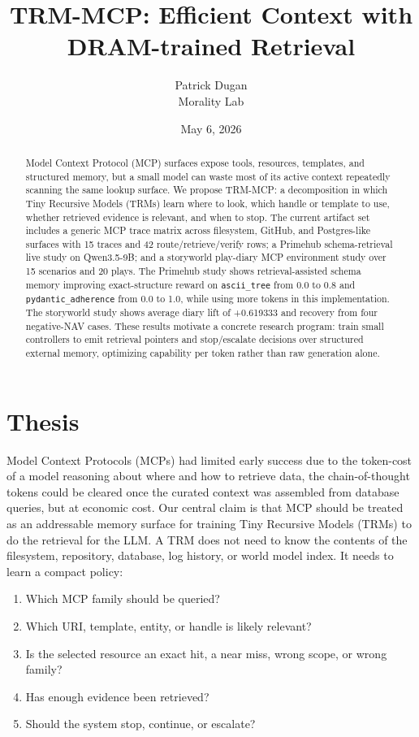 \documentclass[11pt]{article}
\title{TRM-MCP: Efficient Context with DRAM-trained Retrieval }
\author{Patrick Dugan\\Morality Lab}
\date{May 6, 2026}
\begin{document}
\maketitle

\begin{abstract}
Model Context Protocol (MCP) surfaces expose tools, resources, templates, and structured memory, but a small model can waste most of its active context repeatedly scanning the same lookup surface. We propose TRM-MCP: a decomposition in which Tiny Recursive Models (TRMs) learn where to look, which handle or template to use, whether retrieved evidence is relevant, and when to stop. The current artifact set includes a generic MCP trace matrix across filesystem, GitHub, and Postgres-like surfaces with 15 traces and 42 route/retrieve/verify rows; a Primehub schema-retrieval live study on Qwen3.5-9B; and a storyworld play-diary MCP environment study over 15 scenarios and 20 plays. The Primehub study shows retrieval-assisted schema memory improving exact-structure reward on \texttt{ascii\_tree} from 0.0 to 0.8 and \texttt{pydantic\_adherence} from 0.0 to 1.0, while using more tokens in this implementation. The storyworld study shows average diary lift of +0.619333 and recovery from four negative-NAV cases. These results motivate a concrete research program: train small controllers to emit retrieval pointers and stop/escalate decisions over structured external memory, optimizing capability per token rather than raw generation alone.
\end{abstract}

\section{Thesis}

Model Context Protocols (MCPs) had limited early success due to the token-cost of a model reasoning about where and how to retrieve data, the chain-of-thought tokens could be cleared once the curated context was assembled from database queries, but at economic cost. Our central claim is that MCP should be treated as an addressable memory surface for training Tiny Recursive Models (TRMs) to do the retrieval for the LLM. A TRM does not need to know the contents of the filesystem, repository, database, log history, or world model index. It needs to learn a compact policy:

\begin{enumerate}[leftmargin=*]
  \item Which MCP family should be queried?
  \item Which URI, template, entity, or handle is likely relevant?
  \item Is the selected resource an exact hit, a near miss, wrong scope, or wrong family?
  \item Has enough evidence been retrieved?
  \item Should the system stop, continue, or escalate?
\end{enumerate}
\end{document}
